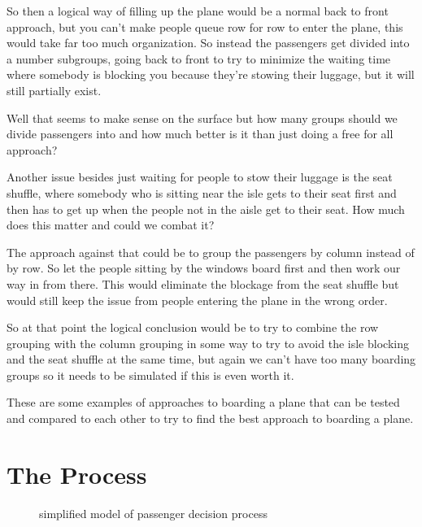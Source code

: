 \documentclass{article}
\begin{document}
So then a logical way of filling up the plane would be a normal back to front
approach, but you can't make people queue row for row 
to enter the plane, this would take far too much organization. So instead 
the passengers get divided into a number subgroups, going back to front to try to minimize
the waiting time where somebody is blocking you because they're stowing
their luggage, but it will still partially exist. 

Well that seems to make sense on the surface but how many groups 
should we divide passengers into and how much better is it than just 
doing a free for all approach?

Another issue besides just waiting for people to stow their luggage is the 
seat shuffle, where somebody who is sitting near the isle gets to their seat first 
and then has to get up when the people not in the aisle get to their seat. How much
does this matter and could we combat it?

The approach against that could be to group the passengers
by column instead of by row. So let the people sitting by the windows board first 
and then work our way in from there. This would eliminate the blockage from
the seat shuffle but would still keep the issue from people 
entering the plane in the wrong order. 

So at that point the logical conclusion would be to try to combine
the row grouping with the column grouping in some way to try to avoid the 
isle blocking and the seat shuffle at the same time, but again we can't
have too many boarding groups so it needs to be simulated if this is even
worth it.

These are some examples of approaches to boarding a plane that can be tested and 
compared to each other to try to find the best approach to boarding a plane. 

\section{The Process}

\begin{center}
\begin{figure}[h]
    \caption{simplified model of passenger decision process}
    \label{fig:simp_model}
\end{figure}
\end{center}
\end{document}

